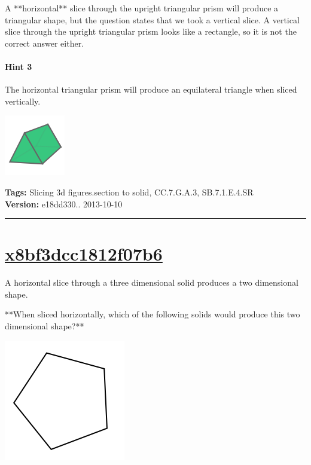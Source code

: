 \documentclass[twocolumn,10pt]{article}
\def\shrinkfactor{0.4}
\begin{document}
A **horizontal** slice through the upright triangular prism will produce a triangular shape, but the question states that we took a vertical slice.
A vertical slice through the upright triangular prism looks like a rectangle, so it is not the correct answer either.

\paragraph{Hint 3}The horizontal triangular prism will produce an equilateral triangle when sliced vertically.  

\includegraphics[scale=\shrinkfactor]{figures/14c5d54ad8e900843fbf2ef335f5a5a14d651f5b.png}



\medskip
\noindent
\textbf{Tags:} {\footnotesize Slicing 3d figures.section to solid, CC.7.G.A.3, SB.7.1.E.4.SR}\\
\textbf{Version:} e18dd330.. 2013-10-10
\smallskip\hrule





\section{\href{https://www.khanacademy.org/devadmin/content/items/x8bf3dcc1812f07b6}{x8bf3dcc1812f07b6}}

\noindent
A horizontal slice through a three dimensional solid produces a two dimensional shape.

**When sliced horizontally, which of the following solids would produce this two dimensional shape?**   

\includegraphics[scale=\shrinkfactor]{figures/f6f3d7d862af181c9db9337ad959b4868e25835c.png} 
\end{document}
